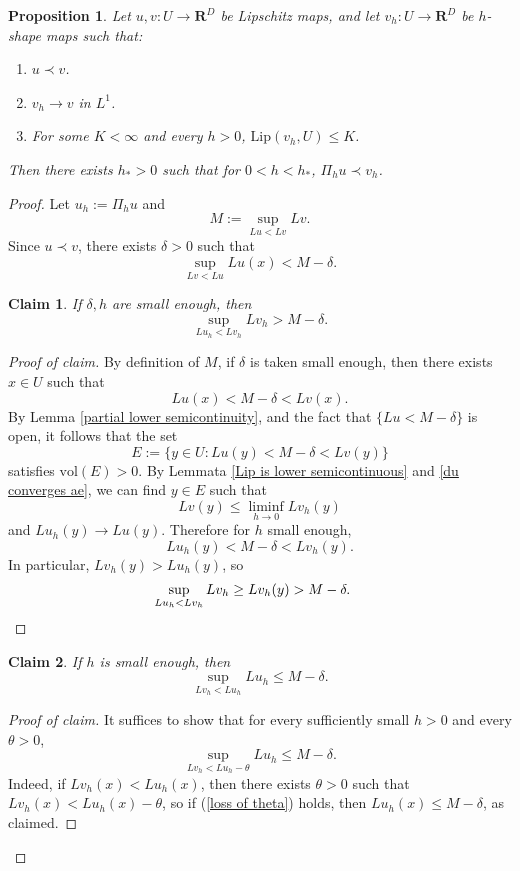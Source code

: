 \documentclass[reqno,11pt]{amsart}
\newcommand{\RR}{\mathbf{R}}
\newcommand{\vol}{\mathrm{vol}}
\newcommand{\Lip}{\mathrm{Lip}}
\newtheorem{proposition}[theorem]{Proposition}
\newtheorem{claim}{Claim}[theorem]
\theoremstyle{definition}
\numberwithin{equation}{section}
\begin{document}
\begin{proposition}\label{discrete tight maps converge}
Let $u, v: U \to \RR^D$ be Lipschitz maps, and let $v_h: U \to \RR^D$ be $h$-shape maps such that:
\begin{enumerate}
\item $u \prec v$.
\item $v_h \to v$ in $L^1$.
\item For some $K < \infty$ and every $h > 0$, $\Lip(v_h, U) \leq K$.
\end{enumerate}
Then there exists $h_* > 0$ such that for $0 < h < h_*$, $\Pi_h u \prec v_h$.
\end{proposition}
\begin{proof}
Let $u_h := \Pi_h u$ and
$$M := \sup_{Lu < Lv} Lv.$$
Since $u \prec v$, there exists $\delta > 0$ such that
$$\sup_{Lv < Lu} Lu(x) < M - \delta.$$

\begin{claim}
If $\delta, h$ are small enough, then 
$$\sup_{Lu_h < Lv_h} Lv_h > M - \delta.$$
\end{claim}
\begin{proof}[Proof of claim]
By definition of $M$, if $\delta$ is taken small enough, then there exists $x \in U$ such that
$$Lu(x) < M - \delta < Lv(x).$$
By Lemma \ref{partial lower semicontinuity}, and the fact that $\{Lu < M - \delta\}$ is open, it follows that the set
$$E := \{y \in U: Lu(y) < M - \delta < Lv(y)\}$$
satisfies $\vol(E) > 0$.
By Lemmata \ref{Lip is lower semicontinuous} and \ref{du converges ae}, we can find $y \in E$ such that
$$Lv(y) \leq \liminf_{h \to 0} Lv_h(y)$$
and $Lu_h(y) \to Lu(y)$.
Therefore for $h$ small enough,
$$Lu_h(y) < M - \delta < Lv_h(y).$$
In particular, $Lv_h(y) > Lu_h(y)$, so 
\begin{align*}
\sup_{Lu_h < Lv_h} Lv_h \geq Lv_h(y) &> M - \delta. \qedhere 
\end{align*}
\end{proof}

\begin{claim}
If $h$ is small enough, then 
$$\sup_{Lv_h < Lu_h} Lu_h \leq M - \delta.$$
\end{claim}
\begin{proof}[Proof of claim]
It suffices to show that for every sufficiently small $h > 0$ and every $\theta > 0$,
\begin{equation}\label{loss of theta}
\sup_{Lv_h < Lu_h - \theta} Lu_h \leq M - \delta.
\end{equation}
Indeed, if $Lv_h(x) < Lu_h(x)$, then there exists $\theta > 0$ such that $Lv_h(x) < Lu_h(x) - \theta$, so if (\ref{loss of theta}) holds, then $Lu_h(x) \leq M - \delta$, as claimed.


\end{proof}
\end{proof}
\end{document}
